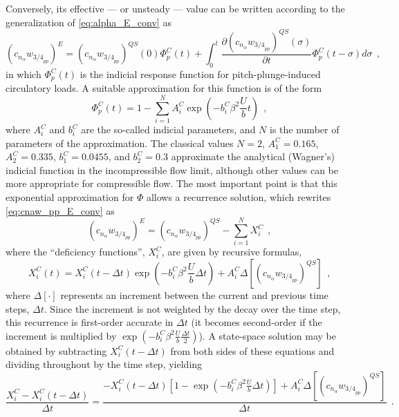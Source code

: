 \documentclass[12pt,a4paper,oneside,english]{abntex2} %
\newcommand{\fix}[1]{{\color{red}#1}}
\newcommand{\del}[2]{\frac{\partial#1}{\partial#2}}
\def\lb{\left[}
\def\rb{\right]}
\def\lp{\left(}
\def\rp{\right)}
\def\dt{\Delta t}
\def\dt{\Delta t}
\begin{document}
Conversely, its effective --- or unsteady --- value can be written according to the generalization of \cref{eq:alpha_E_conv} as
\begin{equation}
    \lp c_{n_{\alpha}}w_{{3/4}_{pp}}\rp^{E} = \lp c_{n_{\alpha}}w_{{3/4}_{pp}}\rp^{QS}(0)\Phi_p^C(t) + \int_0^t \del{\lp c_{n_{\alpha}}w_{{3/4}_{pp}}\rp^{QS}(\sigma)}{t} \Phi_p^C(t-\sigma) d\sigma \ \ ,
    \label{eq:cnaw_pp_E_conv} 
\end{equation}
in which $\Phi_p^C(t)$ is the indicial response function for pitch-plunge-induced circulatory loads. A suitable approximation for this function is of the form
\begin{equation}
    \Phi_p^C(t) = 1 - \sum_{i=1}^{N} A_i^C \exp{\lp{-b_i^C\beta^2\frac{U}{b}t}\rp} \ \ ,
    \label{eq:Phi_p}
\end{equation}
where $A_i^C$ and $b_i^C$ are the so-called indicial parameters, and $N$ is the number of parameters of the approximation. The classical values $N=2$, $A_1^C=0.165$, $A_2^C=0.335$, $b_1^C=0.0455$, and $b_2^C=0.3$ \cite{leishman2006principles} approximate the analytical (Wagner's) indicial function in the incompressible flow limit, although other values can be more appropriate for compressible flow. The most important point is that this exponential approximation for $\Phi$ allows a recurrence solution, which rewrites \cref{eq:cnaw_pp_E_conv} as
\begin{equation}
    \lp c_{n_{\alpha}}w_{{3/4}_{pp}}\rp^E = \lp c_{n_{\alpha}}w_{{3/4}_{pp}}\rp^{QS} - \sum_{i=1}^{N}X_i^C \ \ ,
    \label{eq:cnaw_pp_E_recurrence}
\end{equation}
where the ``deficiency functions'', $X_i^C$, are given by recursive formulas,
\begin{equation}
    X_i^C(t) = X_i^C \lp t-\Delta t \rp \exp{\lp{-b_i^C\beta^2\frac{U}{b}\dt}\rp} + A_i^C \Delta\lb\lp c_{n_{\alpha}}w_{{3/4}_{pp}}\rp^{QS}\rb \ \ ,
    \label{eq:recursive_formula}
\end{equation}
where $\Delta\lb\cdot\rb$ represents an increment between the current and previous time steps, $\dt$. \fix{Since the increment is not weighted by the decay over the time step, this recurrence is first-order accurate in $\dt$ (it becomes second-order if the increment is multiplied by $\exp(-b_i^C\beta^2\frac{U}{b}\frac{\dt}{2})$).} A state-space solution may be obtained by subtracting $X_i^C \lp t-\dt \rp$ from both sides of these equations and dividing throughout by the time step, yielding
\begin{equation}
    \frac{X_i^C-X_i^C(t-\dt)}{\dt} = \frac{-X_i^C \lp t-\dt \rp \lb 1-\exp{\lp{-b_i^C\beta^2\frac{U}{b}\dt}\rp} \rb + A_i^C \Delta\lb\lp c_{n_{\alpha}}w_{{3/4}_{pp}}\rp^{QS}\rb}{\dt} \ \ .
    \label{eq:pre_state_space_pp_indicial}
\end{equation}
\end{document}
